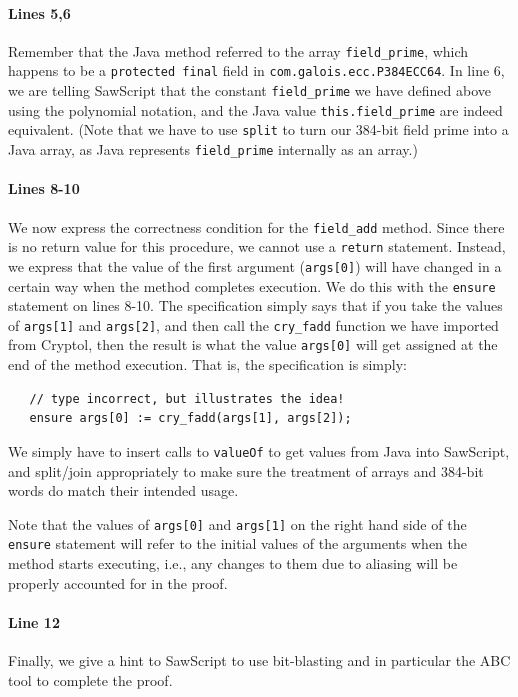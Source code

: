 \documentclass[12pt]{galois-whitepaper}
\newcommand{\sawScript}{{\sc SawScript}\xspace}
\begin{document}
\paragraph{Lines 5,6} Remember that the Java method referred to the array {\tt field\_prime}, which happens to be a {\tt protected final}
field in {\tt com.galois.ecc.P384ECC64}. In line 6, we are telling \sawScript that the constant {\tt field\_prime}
we have defined above using the polynomial notation, and the Java value {\tt this.field\_prime} are indeed equivalent.
(Note that we have to use {\tt split} to turn our 384-bit field prime into a Java array, as Java represents {\tt field\_prime}
internally as an array.)

\paragraph{Lines 8-10} We now express the correctness condition for the {\tt field\_add} method. Since there is no return value for this
procedure, we cannot use a {\tt return} statement. Instead, we express that the value of the first argument ({\tt args[0]}) will have 
changed in a certain way when the method completes execution. We do this with the {\tt ensure} statement on lines 8-10.
The specification simply says that if you take the values of {\tt args[1]} and
{\tt args[2]}, and then call the {\tt cry\_fadd} function we have imported from Cryptol,
then the result is what the value {\tt args[0]} will get assigned at the end of the method execution. That is, the
specification is simply:
\begin{Verbatim}
   // type incorrect, but illustrates the idea!
   ensure args[0] := cry_fadd(args[1], args[2]);
\end{Verbatim}
We simply have to insert calls to {\tt valueOf} to get values from Java into \sawScript, and split/join appropriately
to make sure the treatment of arrays and 384-bit words do match their intended usage. 

Note that the values of {\tt args[0]} and {\tt args[1]}
on the right hand side of the {\tt ensure} statement will refer to the initial values of the arguments when the method starts executing,
i.e., any changes to them due to aliasing will be properly accounted for in the proof.

\paragraph{Line 12} Finally, we give a hint to \sawScript to use bit-blasting and in particular the ABC tool to complete the proof. 
\end{document}
